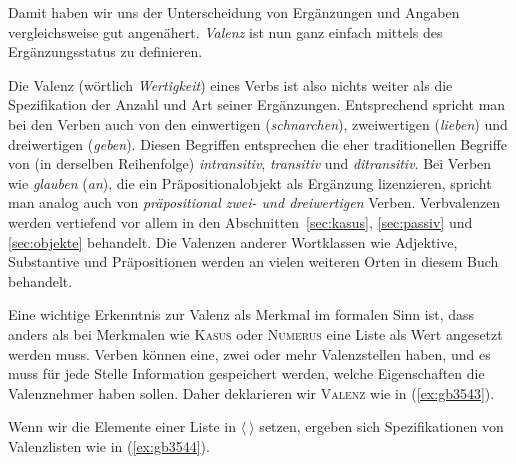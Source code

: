 Damit haben wir uns der Unterscheidung von Ergänzungen und Angaben vergleichsweise gut angenähert.
\textit{Valenz} ist nun ganz einfach mittels des Ergänzungsstatus zu definieren.


Die Valenz (wörtlich \textit{Wertigkeit}) eines Verbs ist also nichts weiter als die Spezifikation der Anzahl und Art seiner Ergänzungen.
Entsprechend spricht man bei den Verben auch von den einwertigen (\textit{schnarchen}), zweiwertigen (\textit{lieben}) und dreiwertigen (\textit{geben}).
Diesen Begriffen entsprechen die eher traditionellen Begriffe von (in derselben Reihenfolge) \textit{intransitiv}, \textit{transitiv} und \textit{ditransitiv}.
Bei Verben wie \textit{glauben} (\textit{an}), die ein Präpositionalobjekt als Ergänzung lizenzieren, spricht man analog auch von \textit{präpositional zwei- und dreiwertigen} Verben.\label{abs:praepditrans}
Verbvalenzen werden vertiefend vor allem in den Abschnitten~\ref{sec:kasus}, \ref{sec:passiv} und \ref{sec:objekte} behandelt.
Die Valenzen anderer Wortklassen wie Adjektive, Substantive und Präpositionen werden an vielen weiteren Orten in diesem Buch behandelt.


Eine wichtige Erkenntnis zur Valenz als Merkmal im formalen Sinn ist, dass anders als bei Merkmalen wie \textsc{Kasus} oder \textsc{Numerus} eine Liste als Wert angesetzt werden muss.
Verben können \zB eine, zwei oder mehr Valenzstellen haben, und es muss für jede Stelle Information gespeichert werden, welche Eigenschaften die Valenznehmer haben sollen.
Daher deklarieren wir \textsc{Valenz} wie in (\ref{ex:gb3543}).

\begin{exe}
\end{exe}

Wenn wir die Elemente einer Liste in $\langle\ \rangle$ setzen, ergeben sich Spezifikationen von Valenzlisten wie in (\ref{ex:gb3544}).

\begin{exe}
  \ex\label{ex:gb3544} 
  \begin{xlist}
  \end{xlist}
\end{exe}

